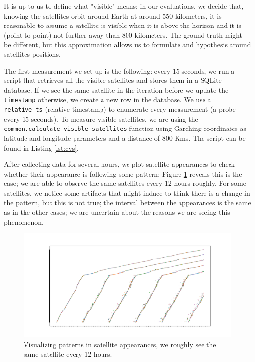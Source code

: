 \documentclass[]{report}
\begin{document}
It is up to us to define what "visible" means; in our evaluations, we decide that, knowing the satellites orbit around
Earth at around 550 kilometers, it is reasonable to assume a satellite is visible when it is above the horizon and it is
(point to point) not further away than 800 kilometers. The ground truth might be different, but this approximation
allows us to formulate and hypothesis around satellites positions. 

The first measurement we set up is the following: every 15 seconds, we run a script that retrieves all the visible
satellites and stores them in a SQLite database. If we see the same satellite in the iteration before we update the
\texttt{timestamp} otherwise, we create a new row in the database. We use a \texttt{relative\_ts} (relative timestamp)
to enumerate every measurement (a probe every 15 seconds). To measure visible satellites, we are using the
\texttt{common.calculate\_visible\_satellites} function using Garching coordinates as latitude and longitude parameters
and a distance of 800 Kms. The script can be found in Listing \ref{lst:cvs}.

After collecting data for several hours, we plot satellite appearances to check whether their appearance is following
some pattern; Figure \ref{fig:vis-sat-pat} reveals this is the case; we are able to observe the same satellites every 12
hours roughly. For some satellites, we notice some artifacts that might induce to think there is a change in the
pattern, but this is not true; the interval between the appearances is the same as in the other cases; we are uncertain
about the reasons we are seeing this phenomenon.

\begin{figure}
    \centering
    \includegraphics[width=1.0\columnwidth]{img/patterns-in-satellite-appearances.pdf}
    \caption{Visualizing patterns in satellite appearances, we roughly see the same satellite every 12 hours.}
    \label{fig:vis-sat-pat}
\end{figure}
\end{document}
